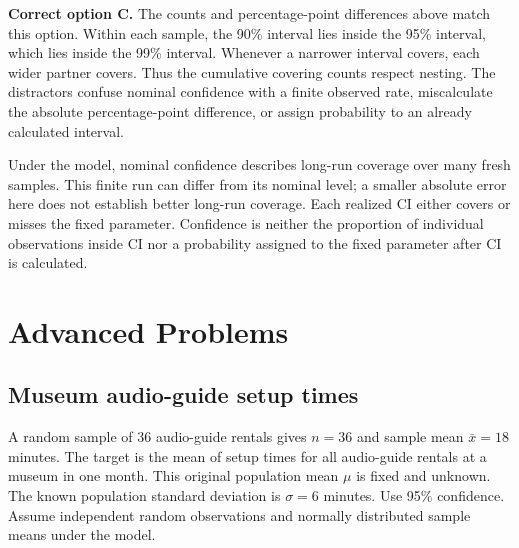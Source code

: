 \textbf{Correct option C.} The counts and percentage-point differences above match this option. Within each sample, the 90\% interval lies inside the 95\% interval, which lies inside the 99\% interval. Whenever a narrower interval covers, each wider partner covers. Thus the cumulative covering counts respect nesting. The distractors confuse nominal confidence with a finite observed rate, miscalculate the absolute percentage-point difference, or assign probability to an already calculated interval.

Under the model, nominal confidence describes long-run coverage over many fresh samples. This finite run can differ from its nominal level; a smaller absolute error here does not establish better long-run coverage. Each realized $\mathrm{CI}$ either covers or misses the fixed parameter. Confidence is neither the proportion of individual observations inside $\mathrm{CI}$ nor a probability assigned to the fixed parameter after $\mathrm{CI}$ is calculated.
\par\nopagebreak[4]
\par\vspace{3mm}
\clearpage
\section{Advanced Problems}
\label{sec:advanced}

\subsection{Museum audio-guide setup times}
\label{prob:c2-advanced-a}

A random sample of 36 audio-guide rentals gives $n=36$ and sample mean $\bar{x}=18$ minutes. The target is the mean of setup times for all audio-guide rentals at a museum in one month. This original population mean $\mu$ is fixed and unknown. The known population standard deviation is $\sigma=6$ minutes. Use 95\% confidence. Assume independent random observations and normally distributed sample means under the model.

